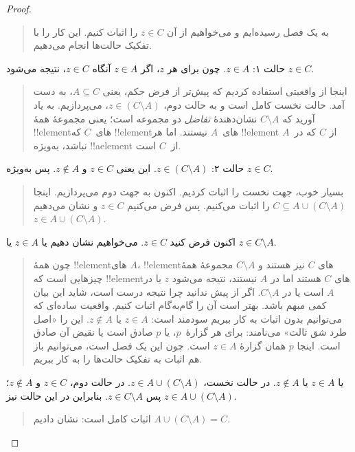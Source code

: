 \documentclass[../../../include/open-logic-section]{subfiles}
\begin{document}
\begin{proof}
  \begin{quote}
    به یک فصل رسیده‌ایم و می‌خواهیم از آن $z \in C$ را اثبات کنیم.
    این کار را با تفکیک حالت‌ها انجام می‌دهیم.
  \end{quote}
  حالت ۱: $z \in A$. چون برای هر $z$، اگر $z \in A$ آنگاه
  $z \in C$، نتیجه می‌شود $z \in C$.
  \begin{quote}
    اینجا از واقعیتی استفاده کردیم که پیش‌تر از فرض حکم، یعنی
    $A \subseteq C$، به دست آمد. حالت نخست کامل است و به حالت دوم،
    $z \in (C \setminus A)$، می‌پردازیم. به یاد آورید که
    $C \setminus A$ نشان‌دهندهٔ \emph{تفاضل} دو مجموعه است؛ یعنی
    مجموعهٔ همهٔ !!{element}های~$C$ که !!{element}های~$A$ نیستند. اما
    هر !!{element} از $C$ که در~$A$ نباشد، به‌ویژه !!a{element} از~$C$
    است.
  \end{quote}
  حالت ۲: $z \in (C \setminus A)$. این یعنی $z \in C$ و
  $z \notin A$. پس به‌ویژه $z \in C$.
  \begin{quote}
    بسیار خوب، جهت نخست را اثبات کردیم. اکنون به جهت دوم می‌پردازیم.
    اینجا $C \subseteq A \cup (C \setminus A)$ را اثبات می‌کنیم. پس
    فرض می‌کنیم $z \in C$ و نشان می‌دهیم
    $z \in A \cup (C \setminus A)$.
  \end{quote}
  اکنون فرض کنید $z \in C$. می‌خواهیم نشان دهیم یا $z \in A$ یا
  $z \in C \setminus A$.
  \begin{quote}
    چون همهٔ !!{element}های $A$، !!{element}های $C$ نیز هستند و
    $C \setminus A$ مجموعهٔ همهٔ چیزهایی است که !!{element}های $C$
    هستند اما در $A$ نیستند، نتیجه می‌شود $z$ یا در $A$ است یا در
    $C \setminus A$. اگر از پیش ندانید چرا نتیجه درست است، شاید این
    بیان کمی مبهم باشد. بهتر است آن را گام‌به‌گام اثبات کنیم. واقعیت
    ساده‌ای که می‌توانیم بدون اثبات به کار ببریم سودمند است:
    $z \in A$ یا $z \notin A$. این را «اصل طرد شق ثالث» می‌نامند: برای
    هر گزارهٔ~$p$، یا $p$ صادق است یا نقیض آن صادق است. اینجا $p$
    همان گزارهٔ $z \in A$ است. چون این یک فصل است، می‌توانیم باز هم
    اثبات به تفکیک حالت‌ها را به کار ببریم.
  \end{quote}
  یا $z \in A$ یا $z \notin A$. در حالت نخست،
  $z \in A \cup (C \setminus A)$. در حالت دوم، $z \in C$ و
  $z \notin A$؛ پس $z \in C \setminus A$. بنابراین در این حالت نیز
  $z \in A \cup (C \setminus A)$.
  \begin{quote}
    اثبات کامل است: نشان دادیم $A \cup (C \setminus A) = C$.
  \end{quote}
\end{proof}
\end{document}
